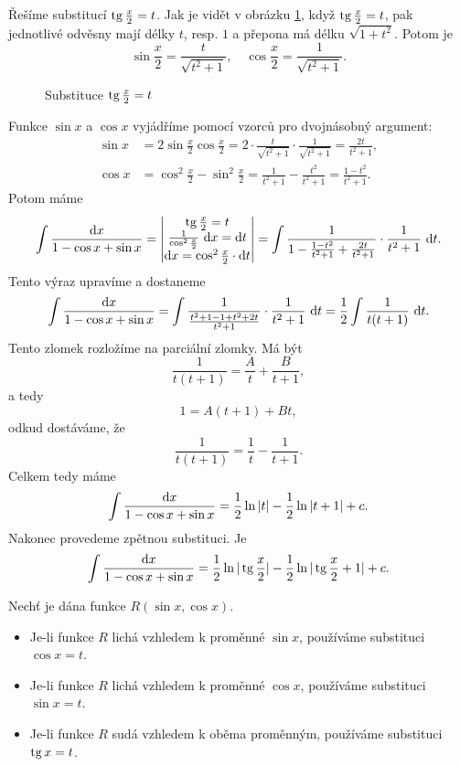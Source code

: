 \begin{reseni}
Řešíme substitucí $\operatorname{tg} \frac{x}{2}=t$. Jak je vidět v obrázku \ref{subs}, když $\operatorname{tg} \frac{x}{2} = t$, pak
jednotlivé odvěsny mají délky $t$, resp. $1$  a přepona má délku $\sqrt{1+t^2}$. Potom je
$$
    \sin \frac{x}{2} = \frac{t}{\sqrt{t^2 + 1}}, \quad \cos \frac{x }{2} = \frac{1}{\sqrt{t^2 + 1}}.
$$
\begin{figure}[h]
	\centering
	\caption{Substituce $\operatorname{tg} \frac{x}{2} = t$}
	\label{subs}
\end{figure}
Funkce $\sin x$ a $\cos x$ vyjádříme pomocí vzorců pro dvojnásobný argument:
\begin{align*}
	\sin x &= 2 \sin \frac{x}{2}\cos \frac{x }{2} = 2 \cdot \frac{t }{\sqrt{t^2 + 1}} \cdot \frac{1}{\sqrt{t^2 + 1}} = \frac{2t}{t^2 + 1}, \\
	\cos x &= \cos^2 \frac{x}{2} - \sin^2 \frac{x }{2} = \frac{1}{t^2 + 1} - \frac{t^2}{t^2 + 1} = \frac{1 - t^2}{t^2 + 1}.
\end{align*}
Potom máme
$$
    \int \frac{\mathop{}\!\mathrm{d} x}{1-\cos x+\sin x} = \begin{vmatrix}
	\operatorname{tg} \frac{x}{2} = t \\
	\frac{1}{\cos^2 \frac{x }{2}} \, \mathop{}\!\mathrm{d} x = \mathop{}\!\mathrm{d} t\\
	\mathop{}\!\mathrm{d} x = \cos^2 \frac{x }{2} \cdot \mathop{}\!\mathrm{d} t
    \end{vmatrix} = \int \frac{1}{1 - \frac{1-t^2}{t^2 + 1} + \frac{2t}{t^2+1}} \cdot \frac{1}{t^2 + 1}\, \mathop{}\!\mathrm{d} t.
$$
Tento výraz upravíme a dostaneme
$$
    \int \frac{\mathop{}\!\mathrm{d} x}{1-\cos x+\sin x} = \int \frac{1}{\frac{t^2 + 1-1+t^2 +2t}{t^2+1}} \cdot \frac{1}{t^2+1} \, \mathop{}\!\mathrm{d} t = \frac{1}{2}\int \frac{1}{t(t+1)}\, \mathop{}\!\mathrm{d} t.
$$
Tento zlomek rozložíme na parciální zlomky. Má být
$$
\frac{1}{t(t+1)} = \frac{A}{t} + \frac{B }{t+1},
$$
a tedy
$$
    1 = A(t+1) + Bt,
$$
odkud dostáváme, že
$$
    \frac{1}{t(t+1)} = \frac{1}{t} - \frac{1}{t+1}.
$$
Celkem tedy máme
$$
    \int \frac{\mathop{}\!\mathrm{d} x}{1-\cos x+\sin x} = \frac{1}{2} \operatorname{ln} |t| - \frac{1}{2} \operatorname{ln} |t+1| + c.
$$
Nakonec provedeme zpětnou substituci. Je
$$
    \int \frac{\mathop{}\!\mathrm{d} x}{1-\cos x+\sin x} = \frac{1}{2} \operatorname{ln} |\operatorname{tg} \frac{x}{2}| - \frac{1}{2} \operatorname{ln} |\operatorname{tg} \frac{x}{2}+1| +c.
$$
\end{reseni}

\begin{veta}
    Nechť je dána funkce $R(\sin x, \cos x)$.
    \begin{itemize}
	\item Je-li funkce $R$ lichá vzhledem k
    proměnné $\sin x$, používáme substituci $\cos x=t$.
    \item Je-li funkce $R$ lichá vzhledem k
    proměnné $\cos x$, používáme substituci $\sin x=t$.
    \item Je-li funkce $R$ sudá vzhledem k
    oběma proměnným, používáme substituci $\operatorname{tg} x=t$.
    \end{itemize}
\end{veta}

